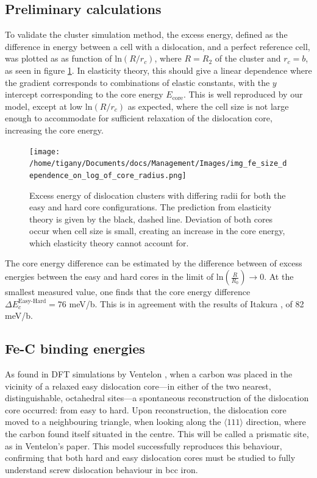 \documentclass[a4paper,11pt]{article}
\begin{document}
\subsection{Preliminary calculations}
\label{sec:orgb765f4a}


To validate the cluster simulation method, the excess energy, defined as the difference in energy
between a cell with a dislocation, and a perfect reference cell, was plotted as as function of
\(\text{ln}(R/r_c)\), where \(R = R_2\) of the cluster and \(r_c = b\), as seen in
figure \ref{lnrdep}. In elasticity theory, this should give a linear dependence where the gradient
corresponds to combinations of elastic constants, with the \(y\) intercept corresponding to the
core energy \(E_{\text{core}}\). This is well reproduced by our model, except at low \(\text{ln}(R/r_c)\)
as expected, where the cell size is not large enough to accommodate for sufficient relaxation of
the dislocation core, increasing the core energy.


\begin{figure}[htbp]
\centering
\texttt{[image: /home/tigany/Documents/docs/Management/Images/img\_fe\_size\_dependence\_on\_log\_of\_core\_radius.png]}
\caption{Excess energy of dislocation clusters with differing radii for both the easy and hard core configurations. The prediction from elasticity theory is given by the black, dashed line. Deviation of both cores occur when cell size is small, creating an increase in the core energy, which elasticity theory cannot account for. \label{lnrdep}}
\end{figure}




The core energy difference can be estimated by the difference between of excess energies between
the easy and hard cores in the limit of \(\text{ln}(\frac{R}{R_0}) \rightarrow 0\). At the smallest measured
value, one finds that the core energy difference \(\Delta E_c^{\text{Easy-Hard}} = 76\) meV/b. This is in
agreement with the results of Itakura \cite{Itakura2012}, of 82 meV/b.



\subsection{Fe-C binding energies}
\label{sec:orgd67c379}



As found in DFT simulations by Ventelon \cite{Ventelon2015}, when a carbon was placed in the
vicinity of a relaxed easy dislocation core---in either of the two nearest, distinguishable,
octahedral sites---a spontaneous reconstruction of the dislocation core occurred: from easy to
hard. Upon reconstruction, the dislocation core moved to a neighbouring triangle, when looking along the \(\langle
   111\rangle\) direction, where the carbon found itself situated in the centre. This will be called a
prismatic site, as in Ventelon's paper. This model successfully
reproduces this behaviour, confirming that both hard and easy dislocation cores must be studied
to fully understand screw dislocation behaviour in bcc iron. 
\end{document}
